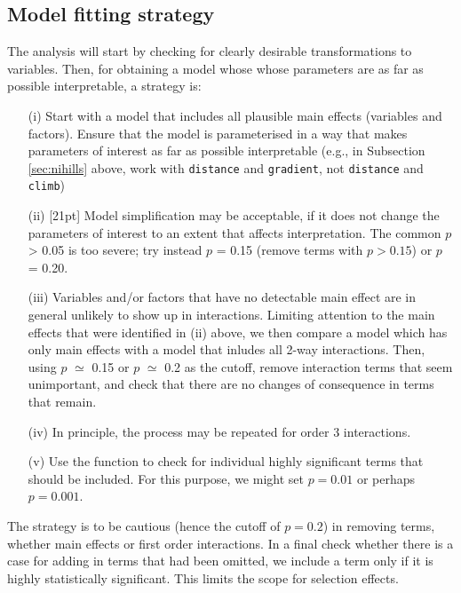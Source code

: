 \subsection{Model fitting strategy}

The analysis will start by checking for clearly desirable
transformations to variables.  Then, for obtaining a model whose
whose parameters are as far as possible interpretable, a strategy
is:
 \begin{itemize}
 \item[(i)] Start with a model that includes all plausible main effects
   (variables and factors).  Ensure that the model is parameterised in
   a way that makes parameters of interest as far as possible
   interpretable (e.g., in Subsection \ref{sec:nihills} above, work
   with \texttt{distance} and \texttt{gradient}, not \texttt{distance}
   and \texttt{climb})
 \item[(ii)]
 [21pt]
   Model simplification may be acceptable, if it does not
   change the parameters of interest to an extent that affects
   interpretation. The common $p$ > 0.05 is too
   severe; try instead
   $p$ = 0.15 (remove terms with $p > 0.15$) or $p$ = 0.20.
 \item[(iii)] Variables and/or factors that have no detectable main
   effect are in general unlikely to show up in interactions.
   Limiting attention to the main effects that were identified in (ii)
   above, we then compare a model which has only main effects with a
   model that inludes all 2-way interactions. Then, using $p$ $\simeq$
   0.15 or $p$ $\simeq$ 0.2 as the cutoff, remove interaction terms
   that seem unimportant, and check that there are no changes of
   consequence in terms that remain.
 \item[(iv)] In principle, the process may be repeated for order 3
   interactions.
\item[(v)] Use the function  to check for individual
highly significant terms that should be included.  For this purpose,
we might set $p=0.01$ or perhaps $p=0.001$.
\end{itemize}
The strategy is to be cautious (hence the cutoff of $p=0.2$) in
removing terms, whether main effects or first order interactions.
In a final check whether there is a case for adding in terms that
had been omitted, we include a term only if it is highly statistically
significant.  This limits the scope for selection effects.


